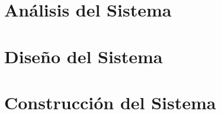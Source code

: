 \documentclass[a4paper,11pt]{book}
\begin{document}
\chapter{Análisis del Sistema}


\chapter{Diseño del Sistema}


\chapter{Construcción del Sistema}


%


%

%

%
\end{document}
